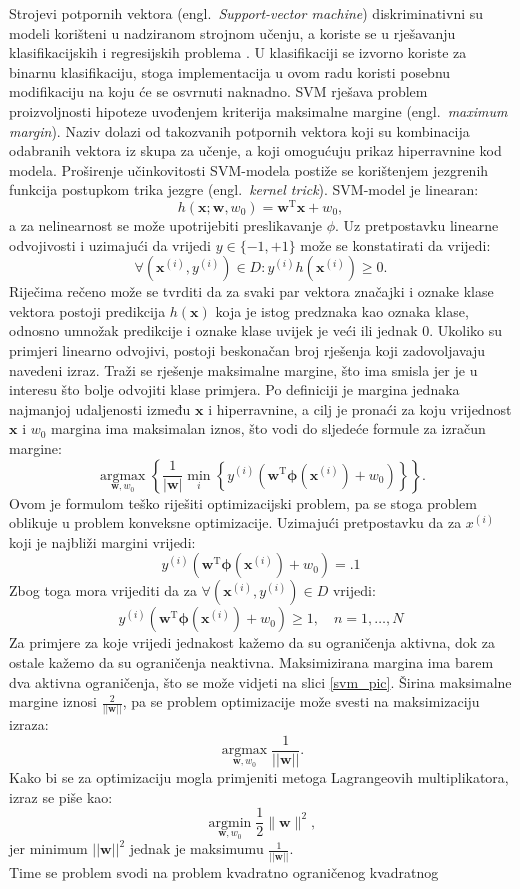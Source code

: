 \documentclass[times, utf8, zavrsni]{fer}
\renewcommand{\vec}[1]{\mathbf{#1}}
\begin{document}
Strojevi potpornih vektora (engl.~\emph{Support-vector machine}) diskriminativni su modeli korišteni u nadziranom strojnom učenju, a koriste se u rješavanju klasifikacijskih i regresijskih problema \citep{strojno_skripta}. U klasifikaciji se izvorno koriste za binarnu klasifikaciju, stoga implementacija u ovom radu koristi posebnu modifikaciju na koju će se osvrnuti naknadno. \gls{SVM} rješava problem proizvoljnosti hipoteze uvođenjem kriterija maksimalne margine (engl.~\emph{maximum margin}). Naziv dolazi od takozvanih potpornih vektora koji su kombinacija odabranih vektora iz skupa za učenje, a koji omogućuju prikaz hiperravnine kod modela. Proširenje učinkovitosti \gls{SVM}-modela postiže se korištenjem jezgrenih funkcija postupkom trika jezgre (engl.~\emph{kernel trick}). \gls{SVM}-model je linearan: \[ h(\vec{x;w},w_0)=\vec{w}^\mathrm{T}\vec{x} + w_0, \] a za nelinearnost se može upotrijebiti preslikavanje $\phi$. Uz pretpostavku linearne odvojivosti i uzimajući da vrijedi $y\in\{-1,+1\}$ može se konstatirati da vrijedi: \[ \forall(\vec{x}^{(i)}, y^{(i)})\in D: y^{(i)}h(\vec{x}^{(i)})\ge 0.\] Riječima rečeno može se tvrditi da za svaki par vektora značajki i oznake klase vektora postoji predikcija $h(\vec{x})$ koja je istog predznaka kao oznaka klase, odnosno umnožak predikcije i oznake klase uvijek je veći ili jednak $0$. Ukoliko su primjeri linearno odvojivi, postoji beskonačan broj rješenja koji zadovoljavaju navedeni izraz. Traži se rješenje maksimalne margine, što ima smisla jer je u interesu što bolje odvojiti klase primjera. Po definiciji je margina jednaka najmanjoj udaljenosti između $\vec{x}$ i hiperravnine, a cilj je pronaći za koju vrijednost $\vec{x}$ i $w_0$ margina ima maksimalan iznos, što vodi do sljedeće formule za izračun margine:\[ \underset{\mathbf{w}, w_{0}}{\operatorname{argmax}}\left\{\frac{1}{|\mathbf{w}|} \min _{i}\left\{y^{(i)}\left(\mathbf{w}^{\mathrm{T}} \boldsymbol{\phi}\left(\mathbf{x}^{(i)}\right)+w_{0}\right)\right\}\right\}. \] Ovom je formulom teško riješiti optimizacijski problem, pa se stoga problem oblikuje u problem konveksne optimizacije. Uzimajući pretpostavku da za $x^{(i)}$ koji je najbliži margini vrijedi: \[ y^{(i)}\left(\mathbf{w}^{\mathrm{T}} \boldsymbol{\phi}\left(\mathbf{x}^{(i)}\right)+w_{0}\right)=.1 \] Zbog toga mora vrijediti da za $\forall(\vec{x}^{(i)}, y^{(i)}) \in D$  vrijedi:\[ y^{(i)}\left(\mathbf{w}^{\mathrm{T}} \boldsymbol{\phi}\left(\mathbf{x}^{(i)}\right)+w_{0}\right) \geqslant 1, \quad n=1, \ldots, N \] Za primjere za koje vrijedi jednakost kažemo da su ograničenja aktivna, dok za ostale kažemo da su ograničenja neaktivna. Maksimizirana margina ima barem dva aktivna ograničenja, što se može vidjeti na slici \ref{svm_pic}. Širina maksimalne margine iznosi $\frac{2}{||\vec{w}||}$, pa se problem optimizacije može svesti na maksimizaciju izraza: \[\underset{\vec{w}, w_{0}}{\operatorname{argmax}} \frac{1}{ ||\vec{w}||}. \] Kako bi se za optimizaciju mogla primjeniti metoga Lagrangeovih multiplikatora, izraz se piše kao: \[ \underset{\mathbf{w}, w_{0}}{\operatorname{argmin}} \frac{1}{2}\|\mathbf{w}\|^{2}, \] jer minimum $||\vec{w}||^2$ jednak je maksimumu $\frac{1}{||\vec{w}||}$.\\Time se problem svodi na problem kvadratno ograničenog kvadratnog 
\end{document}
